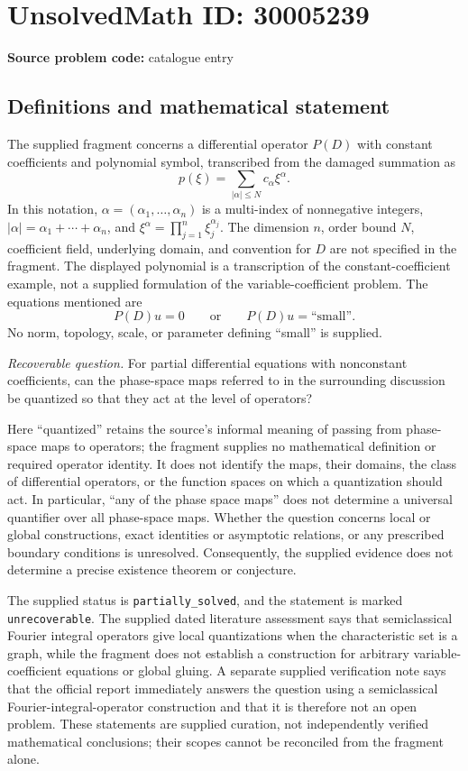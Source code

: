 \documentclass[11pt]{article}
\begin{document}
\section*{UnsolvedMath ID: 30005239}
\textbf{Source problem code:} catalogue entry
\subsection{Definitions and mathematical statement}
The supplied fragment concerns a differential operator \(P(D)\) with constant coefficients and polynomial symbol, transcribed from the damaged summation as
\[
 p(\xi)=\sum_{|\alpha|\leq N}c_\alpha\xi^\alpha.
\]
In this notation, \(\alpha=(\alpha_1,\ldots,\alpha_n)\) is a multi-index of nonnegative integers, \(|\alpha|=\alpha_1+\cdots+\alpha_n\), and \(\xi^\alpha=\prod_{j=1}^n\xi_j^{\alpha_j}\). The dimension \(n\), order bound \(N\), coefficient field, underlying domain, and convention for \(D\) are not specified in the fragment. The displayed polynomial is a transcription of the constant-coefficient example, not a supplied formulation of the variable-coefficient problem. The equations mentioned are
\[
 P(D)u=0
 \qquad\text{or}\qquad
 P(D)u=\text{``small''}.
\]
No norm, topology, scale, or parameter defining ``small'' is supplied.

\emph{Recoverable question.} For partial differential equations with nonconstant coefficients, can the phase-space maps referred to in the surrounding discussion be quantized so that they act at the level of operators?

Here ``quantized'' retains the source's informal meaning of passing from phase-space maps to operators; the fragment supplies no mathematical definition or required operator identity. It does not identify the maps, their domains, the class of differential operators, or the function spaces on which a quantization should act. In particular, ``any of the phase space maps'' does not determine a universal quantifier over all phase-space maps. Whether the question concerns local or global constructions, exact identities or asymptotic relations, or any prescribed boundary conditions is unresolved. Consequently, the supplied evidence does not determine a precise existence theorem or conjecture.

The supplied status is \texttt{partially\_solved}, and the statement is marked \texttt{unrecoverable}. The supplied dated literature assessment says that semiclassical Fourier integral operators give local quantizations when the characteristic set is a graph, while the fragment does not establish a construction for arbitrary variable-coefficient equations or global gluing. A separate supplied verification note says that the official report immediately answers the question using a semiclassical Fourier-integral-operator construction and that it is therefore not an open problem. These statements are supplied curation, not independently verified mathematical conclusions; their scopes cannot be reconciled from the fragment alone.
\end{document}
